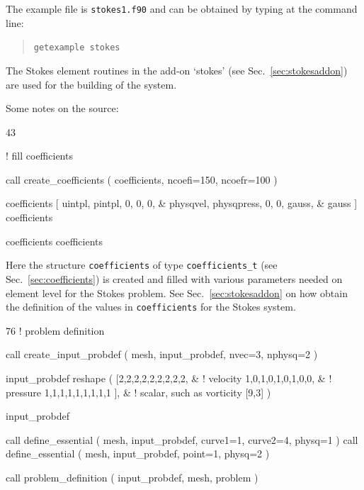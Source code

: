 The example file is \texttt{stokes1.f90} and can be obtained by typing at the
command line:
\begin{quote}
   \texttt{getexample stokes}
\end{quote}

The Stokes element routines
in the add-on `stokes' (see Sec.~\ref{sec:stokesaddon}) are used for
the building of the system. 

Some notes on the source:
\begin{listing}{43}

! fill coefficients

  call create_coefficients ( coefficients, ncoefi=150, ncoefr=100 )

  coefficients%
    [ uintpl,   pintpl,     0,     0,         0,  &
      physqvel, physqpress, 0,     0,     gauss,  &
      gauss ]
  coefficients%

  coefficients%
  coefficients%

\end{listing}
Here the structure \texttt{coefficients} of type \texttt{coefficients\_t} (see
Sec.~\ref{sec:coefficients}) is created and filled with various parameters
needed on element level for the Stokes problem. See Sec.~\ref{sec:stokesaddon}
on how obtain the definition of the values in \texttt{coefficients} for the
Stokes system.
\begin{listing}{76}
! problem definition
                                                                                
  call create_input_probdef ( mesh, input_probdef, nvec=3, nphysq=2 )
                                                                                
  input_probdef%
      reshape ( [2,2,2,2,2,2,2,2,2,    &  ! velocity
                 1,0,1,0,1,0,1,0,0,    &  ! pressure
                 1,1,1,1,1,1,1,1,1 ], &  ! scalar, such as vorticity
                 [9,3] )
                                                                                
  input_probdef%
                                                                                
  call define_essential ( mesh, input_probdef, curve1=1, curve2=4, physq=1 )
  call define_essential ( mesh, input_probdef, point=1, physq=2 )
                                                                                
  call problem_definition ( input_probdef, mesh, problem )
                                                                                
\end{listing}
